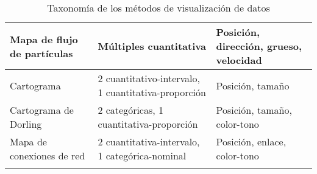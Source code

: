 \begin{longtable}{ | P{3cm} | P{5cm} | P{5cm} |}
  Mapa de flujo de partículas & Múltiples cuantitativa                                        & Posición, dirección, grueso, velocidad \\
  \hline
  Cartograma                 & 2 cuantitativo-intervalo, 1 cuantitativa-proporción            & Posición, tamaño \\
  \hline
  Cartograma de Dorling      & 2 categóricas, 1 cuantitativa-proporción                       & Posición, tamaño, color-tono \\
  \hline
  Mapa de conexiones de red  & 2 cuantitativa-intervalo, 1 categórica-nominal                 & Posición, enlace, color-tono \\
  \hline
  \caption[Taxonomía de los métodos de visualización de datos]{Taxonomía de los métodos de visualización de datos}
  \label{table:appa}
 \end{longtable}
